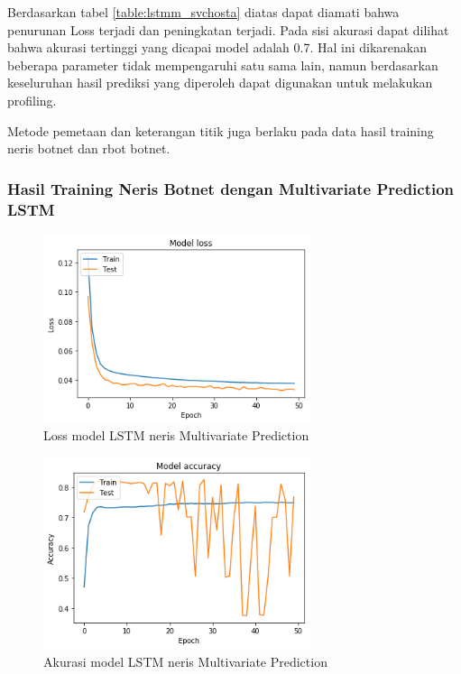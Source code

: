 \documentclass[./skripsi.tex]{subfiles}
\begin{document}
\par Berdasarkan tabel \ref{table:lstmm_svchosta} diatas dapat diamati bahwa penurunan Loss terjadi dan peningkatan terjadi. Pada sisi akurasi dapat dilihat bahwa akurasi tertinggi yang dicapai model adalah 0.7. Hal ini dikarenakan beberapa parameter tidak mempengaruhi satu sama lain, namun berdasarkan keseluruhan hasil prediksi yang diperoleh dapat digunakan untuk melakukan profiling.

\par Metode pemetaan dan keterangan titik juga berlaku pada data hasil training neris botnet dan rbot botnet.

\subsubsection{Hasil Training Neris Botnet dengan Multivariate Prediction LSTM}

\begin{figure}%
    \centering
    \includegraphics[width=0.7\textwidth]{public/assets/img/lstmm_neris_loss.png}
    \caption{Loss model LSTM neris Multivariate Prediction}
    \label{fig:lstmm_neris_loss}
\end{figure}

\begin{figure}%
    \centering
    \includegraphics[width=0.7\textwidth]{public/assets/img/lstmm_neris_acc.png}
    \caption{Akurasi model LSTM neris Multivariate Prediction}
    \label{fig:lstmm_neris_acc}
\end{figure}
\end{document}

